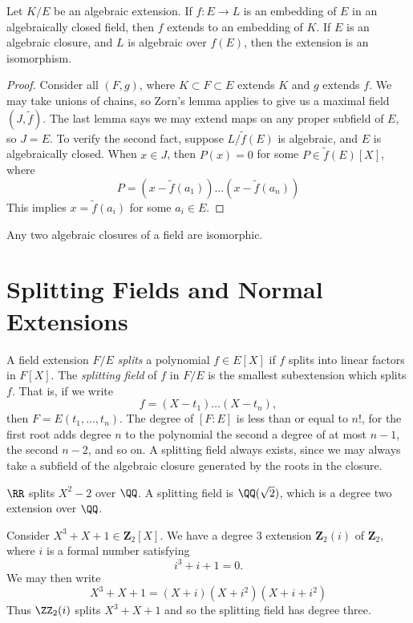\begin{theorem}
    Let $K/E$ be an algebraic extension. If $f:E \to L$ is an embedding of $E$ in an algebraically closed field, then $f$ extends to an embedding of $K$. If $E$ is an algebraic closure, and $L$ is algebraic over $f(E)$, then the extension is an isomorphism.
\end{theorem}
\begin{proof}
    Consider all $(F,g)$, where $K \subset F \subset E$ extends $K$ and $g$ extends $f$. We may take unions of chains, so Zorn's lemma applies to give us a maximal field $(J,\tilde{f})$. The last lemma says we may extend maps on any proper subfield of $E$, so $J = E$. To verify the second fact, suppose $L/\tilde{f}(E)$ is algebraic, and $E$ is algebraically closed. When $x \in J$, then $P(x) = 0$ for some $P \in \tilde{f}(E)[X]$, where
    \[ P = (x - \tilde{f}(a_1)) \dots (x - \tilde{f}(a_n)) \]
    This implies $x = \tilde{f}(a_i)$ for some $a_i \in E$.
\end{proof}

\begin{corollary}
    Any two algebraic closures of a field are isomorphic.
\end{corollary}






\section{Splitting Fields and Normal Extensions}

A field extension $F/E$ \emph{splits} a polynomial $f \in E[X]$ if $f$ splits into linear factors in $F[X]$. The \emph{splitting field} of $f$ in $F/E$ is the smallest subextension which splits $f$. That is, if we write
%
\[ f = (X - t_1) \dots (X - t_n), \]
%
then $F = E(t_1, \dots, t_n)$. The degree of $[F:E]$ is less than or equal to $n!$, for the first root adds degree $n$ to the polynomial the second a degree of at most $n-1$, the second $n-2$, and so on. A splitting field always exists, since we may always take a subfield of the algebraic closure generated by the roots in the closure.

\begin{example}
    $\RR$ splits $X^2 - 2$ over $\QQ$. A splitting field is $\QQ(\sqrt{2})$, which is a degree two extension over $\QQ$.
\end{example}

\begin{example}
    Consider $X^3 + X + 1 \in \mathbf{Z}_2[X]$. We have a degree 3 extension $\mathbf{Z}_2(i)$ of $\mathbf{Z}_2$, where $i$ is a formal number satisfying
    \[ i^3 + i + 1 = 0. \]
    We may then write
    \[ X^3 + X + 1 = (X + i)(X + i^2)(X + i + i^2) \]
    Thus $\ZZ_2(i)$ splits $X^3 + X + 1$ and so the splitting field has degree three.
\end{example}

